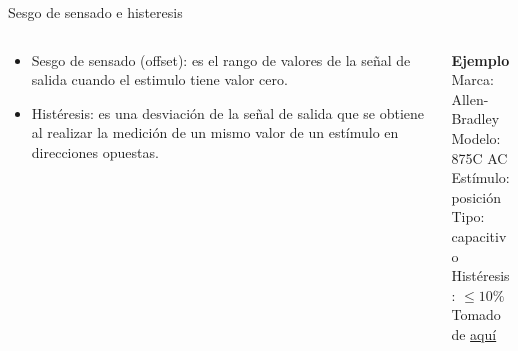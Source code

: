 \documentclass[aspectratio=169]{beamer}
\begin{document}
\begin{frame}{Sesgo de sensado e histeresis}
    \begin{columns}[c, onlytextwidth]
        \begin{column}{0.50\textwidth}
            \begin{itemize}
                \item Sesgo de sensado (offset): es el rango de valores de la señal de salida cuando el estimulo tiene valor cero. 
                \item Histéresis: es una desviación de la señal de salida  que se obtiene al realizar la medición de un mismo valor de un estímulo en direcciones opuestas.
            \end{itemize}
        \end{column}
        \begin{column}{0.45\textwidth}
            \textbf{Ejemplo}\\[4pt]
            Marca: Allen-Bradley\\[4pt]
            Modelo: 875C AC\\[4pt]
            Estímulo: posición\\[4pt]
            Tipo: capacitivo\\[4pt]
            Histéresis: $\leq 10 \%$\\[10pt]
            \tiny{Tomado de \href{https://literature.rockwellautomation.com/idc/groups/literature/documents/td/875-td001_-en-p.pdf}{aquí}}
        \end{column}
    \end{columns}
\end{frame}
\end{document}

